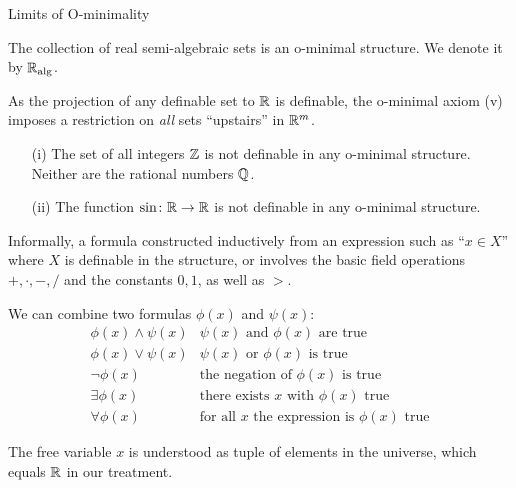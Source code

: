 \documentclass{beamer}
\begin{document}
\begin{frame}{Limits of O-minimality}
  \begin{theorem}
    The collection of real semi-algebraic sets is an o-minimal
    structure. We denote it by ${\mathbb{R}}_{\mathrm{alg}}$. 
  \end{theorem}

  As the projection of any definable set to ${\mathbb{R}}$ is definable, the
  o-minimal axiom (v) imposes a restriction on \emph{all} sets
  ``upstairs'' in ${\mathbb{R}}^m$.

  \begin{example}
    \begin{enumerate}
    \item [(i)] The set of all integers ${\mathbb{Z}}$ is \alert{not} definable in any
      o-minimal structure. Neither are the rational numbers ${\mathbb{Q}}$.
    \item[(ii)] The function $\sin \colon{\mathbb{R}}\rightarrow{\mathbb{R}}$ is
      \alert{not} definable in any o-minimal structure. 
    \end{enumerate}
  \end{example}
\end{frame}

\begin{frame}
  Informally, a formula constructed inductively from  an expression
  such as ``$x\in X$'' where $X$ is definable
  in the structure, or involves
  the basic field operations $+,\cdot,-,/$
  and the constants $0,1$, as well as $>$.
  
  We can combine two formulas $\phi(x)$ and $\psi(x)$:
  \begin{equation*}
    \begin{array}{ll}
      \phi(x) \wedge \psi(x) & \text{$\psi(x)$ and $\phi(x)$ are true}\\
     \phi(x) \vee \psi(x) & \text{$\psi(x)$ or $\phi(x)$  is true}\\
     \neg \phi(x)  & \text{the negation of $\phi(x)$ is true}\\
     \exists \phi(x) &\text{there exists $x$ with $\phi(x)$ true}\\
     \forall \phi(x) &\text{for all $x$ the expression is $\phi(x)$ true}
    \end{array}
  \end{equation*}

  The free variable $x$ is understood as tuple of elements in the
  \alert{universe}, which equals ${\mathbb{R}}$ in our treatment. 
\end{frame}
\end{document}
